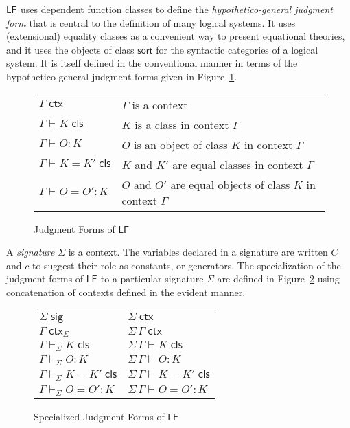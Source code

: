 \documentclass[11pt,twoside]{article}
\newcommand{\LF}[1][]{\ensuremath{\mathsf{LF}_{#1}}}
\newcommand{\sortclass}{\ensuremath{\textsf{sort}}}
\newcommand{\appctx}[2]{{#1}\,{#2}}
\newcommand{\issig}[1]{{#1}\;\mathsf{sig}}
\newcommand{\isctx}[2][]{{#2}\;\mathsf{ctx}_{#1}}
\newcommand{\iscls}[3][]{{#2}\vdash_{#1}{#3}\;\mathsf{cls}}
\newcommand{\eqcls}[4][]{{#2}\vdash_{#1}{#3}={#4}\;\mathsf{cls}}
\newcommand{\isobj}[4][]{{#2}\vdash_{#1}{#3}:{#4}}
\newcommand{\eqobj}[5][]{{#2}\vdash_{#1}{#3}={#4}:{#5}}
\begin{document}
\LF{} uses dependent function classes to define the \emph{hypothetico-general judgment
  form} that is central to the definition of many logical systems.  It uses (extensional)
equality classes as a convenient way to present equational theories, and it uses the
objects of class \sortclass{} for the syntactic categories of a logical system.  It is
itself defined in the conventional manner in terms of the hypothetico-general judgment
forms given in Figure~\ref{fig:lf-judgments}.

\begin{figure}[tp]
  \centering
  \begin{tabular}{l@{\qquad}l}
    $\isctx{\Gamma}$ & $\Gamma$ is a context \\[1ex]
    $\iscls{\Gamma}{K}$ & $K$ is a class in context $\Gamma$ \\
    $\isobj{\Gamma}{O}{K}$ & $O$ is an object of class $K$ in context $\Gamma$ \\[1ex]
    $\eqcls{\Gamma}{K}{K'}$ & $K$ and $K'$ are equal classes in context $\Gamma$ \\
    $\eqobj{\Gamma}{O}{O'}{K}$ & $O$ and $O'$ are equal objects of class $K$ in context $\Gamma$
  \end{tabular}
  \caption{Judgment Forms of \LF{}}
  \label{fig:lf-judgments}
\end{figure}

A \emph{signature} $\Sigma$ is a context.  The variables declared in a signature are written
$C$ and $c$ to suggest their role as constants, or generators.  The specialization of the
judgment forms of \LF{} to a particular signature $\Sigma$ are defined in
Figure~\ref{fig:lf-specialized} using concatenation of contexts defined in the evident
manner.

\begin{figure}[tp]
  \centering
  \begin{tabular}{l@{\qquad\qquad}l}
    $\issig{\Sigma}$             & $\isctx{\Sigma}$ \\[1ex]

    $\isctx[\Sigma]{\Gamma}$           & $\isctx{\appctx{\Sigma}{\Gamma}}$  \\[1ex]
    
    $\iscls[\Sigma]{\Gamma}{K}$           & $\iscls{\appctx{\Sigma}{\Gamma}}{K}$ \\
    $\isobj[\Sigma]{\Gamma}{O}{K}$     & $\isobj{\appctx{\Sigma}{\Gamma}}{O}{K}$ \\[1ex]

    $\eqcls[\Sigma]{\Gamma}{K}{K'}$   & $\eqcls{\appctx{\Sigma}{\Gamma}}{K}{K'}$ \\
    $\eqobj[\Sigma]{\Gamma}{O}{O'}{K}$ & $\eqobj{\appctx{\Sigma}{\Gamma}}{O}{O'}{K}$
  \end{tabular}
  \caption{Specialized Judgment Forms of \LF{}}
  \label{fig:lf-specialized}
\end{figure}
\end{document}
